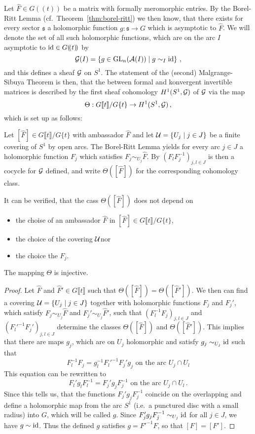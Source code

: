 Let $\hat F\in G(\!(t)\!)$ be a matrix with formally meromorphic entries. By
the Borel-Ritt Lemma (cf.\ Theorem~\ref{thm:borel-ritt}) we then know, that
there exists for every sector $\mathfrak{s}$ a holomorphic function
$g:\mathfrak{s}\to G$ which is asymptotic to $\hat F$.
We will denote the set of all such holomorphic functions, which are on
the arc $I$ asymptotic to $\operatorname{id}\in G(\!(t)\!)$ by
\[
  \mathcal{G}(I)=\left\{g\in\operatorname{GL}_n(\mathcal{A}(I))\mid g\sim_I\operatorname{id}\right\}\,,
\]
and this defines a sheaf $\mathcal{G}$ on $S^1$.
The statement of the (second) Malgrange-Sibuya Theorem is then, that the
 between formal and konvergent invertible matrices is
described by the first sheaf cohomology $H^1(S^1,\mathcal{G})$ of $\mathcal{G}$ via the map
\[
  \Theta: G\llbracket t\rrbracket/G\{t\}\to H^1(S^1,\mathcal{G}) \,,
\]
which is set up as follows:
\begin{einr}
  Let $[\hat F]\in G\llbracket t\rrbracket/G\{t\}$ with ambassador $\hat F$ and
  let $\mathcal{U}=\{U_j\mid j\in J\}$ be a finite covering of $S^1$ by open arcs.
  The Borel-Ritt Lemma yields for every arc $j\in J$ a holomorphic function
  $F_j$ which satisfies $F_j\sim_{U_j}\hat F$.
  By $(F_lF_j^{-1})_{j,l\in J}$ is then a cocycle for $\mathcal{G}$ defined,
  and write $\Theta([\hat F])$ for the corresponding cohomology class.
\end{einr}
It can be verified, that the cass $\Theta([\hat F])$ does not depend on
\begin{itemize}
  \item the choise of an ambassador $\hat F$ in
    $[\hat F]\in G\llbracket t\rrbracket/G\{t\}$\PROBLEM[proof!],
  \item the choice of the covering $\mathcal{U}$\PROBLEM[proof!] nor
  \item the choice the $F_j$\PROBLEM[proof!].
\end{itemize}
\begin{lem}
  The mapping $\Theta$ is injective.
\end{lem}
\begin{proof}
  Let $\hat F$ and $\hat F'\in G\llbracket t\rrbracket$ such that
  $\Theta([\hat F])=\Theta([\hat F'])$.
  We then can find a covering $\mathcal{U}=\{U_j\mid j\in J\}$ together with
  holomorphic functions $F_j$ and $F_j'$, which satisfy
  $F_j\sim_{U_j}\hat F$ and $F_j'\sim_{U_j}\hat F'$, such that
  $(F_l^{-1}F_j)_{j,l\in J}$ and $(F_l'^{-1}F_j')_{j,l\in J}$ determine the
  classes $\Theta([\hat F])$ and $\Theta([\hat F'])$.
  This implies that there are maps $g_j$, which are on $U_j$ holomorphic and
  satisfy $g_j\sim_{U_j}\operatorname{id}$ such that
  \[
    F_l^{-1}F_j=g_l^{-1}F_l'^{-1}F_j'g_j
    \text{~on~the~arc~} U_j\cap U_l
  \]
  This equation can be rewritten to
  \[
    F_l'g_lF_l^{-1}=F_j'g_jF_j^{-1}
    \text{~on~the~arc~} U_j\cap U_l \,.
  \]
  Since this tells us, that the functions $F_j'g_jF_j^{-1}$ coincide on
  the overlapping and define a holomorphic map from the arc $S^1$ (i.e.\ a
  punctured disc with a small radius) into $G$, which will be called $g$.
  Since $F_j'g_jF_j^{-1}\sim_{U_j}\operatorname{id}$ for all $j\in J$, we have
  $g\sim\operatorname{id}$.
  Thus the defined $g$ satisfies $g=F'^{-1}F$, so that $[F]=[F']$.
\end{proof}
